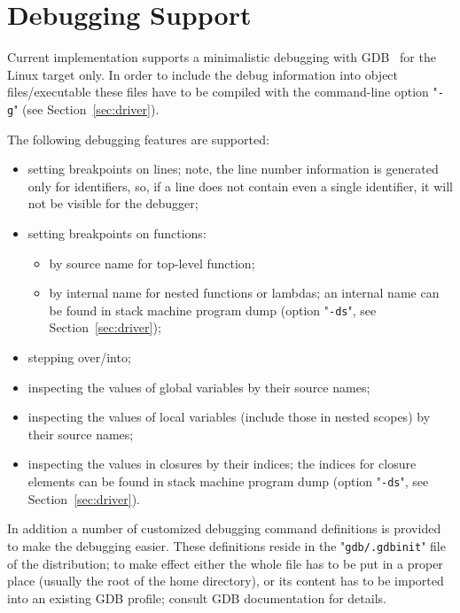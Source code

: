 \chapter{Debugging Support}
\label{sec:debugging}

Current implementation supports a minimalistic debugging with \textsc{GDB}~\cite{gdb} for the Linux target only.
In order to include the debug information into object files/executable these files
have to be compiled with the command-line option "\texttt{-g}" (see Section~\ref{sec:driver}).

The following debugging features are supported:

\begin{itemize}
\item setting breakpoints on lines; note, the line number information is generated only for identifiers, so, if a line does not contain even a single identifier, it
  will not be visible for the debugger;
\item setting breakpoints on functions:
  \begin{itemize}
    \item by source name for top-level function;
    \item by internal name for nested functions or lambdas; an internal name can be found in stack machine program dump (option "\texttt{-ds}", see Section~\ref{sec:driver});
  \end{itemize}
\item stepping over/into;
\item inspecting the values of global variables by their source names;
\item inspecting the values of local variables (include those in nested scopes) by their source names;
\item inspecting the values in closures by their indices; the indices for closure elements can be found in stack machine
  program dump (option "\texttt{-ds}", see Section~\ref{sec:driver}).
\end{itemize}

In addition a number of customized debugging command definitions is provided to make the debugging easier. These definitions reside in the "\texttt{gdb/.gdbinit}"
file of the distribution; to make effect either the whole file has to be put in a proper place (usually the root of the home directory), or its content has to be
imported into an existing \textsc{GDB} profile; consult \textsc{GDB} documentation for details.

